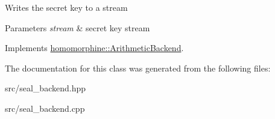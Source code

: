 Writes the secret key to a stream


\begin{DoxyParams}{Parameters}
{\em stream} & secret key stream \\
\hline
\end{DoxyParams}


Implements \mbox{\hyperlink{classhomomorphine_1_1_arithmetic_backend_ad88c797bbb2073ed3af460e568725c3f}{homomorphine\+::\+Arithmetic\+Backend}}.



The documentation for this class was generated from the following files\+:\begin{DoxyCompactItemize}
\item 
src/seal\+\_\+backend.\+hpp\item 
src/seal\+\_\+backend.\+cpp\end{DoxyCompactItemize}
